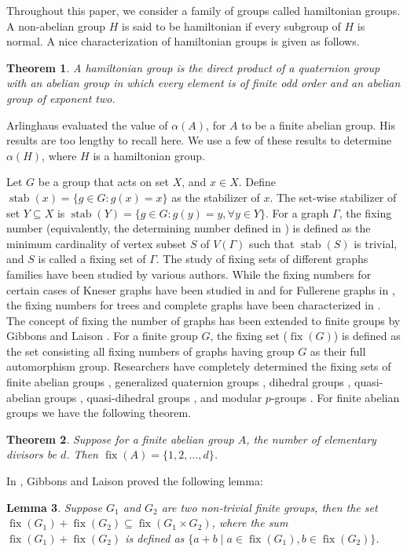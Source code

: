 \documentclass[12pt]{article}
\theoremstyle{plain}
\newtheorem{theorem}{Theorem}[section]
\newtheorem{lemma}[theorem]{Lemma}
\theoremstyle{definition}
\newcommand{\stab}{\mathop{\mathrm{stab}}}
\newcommand{\fix}{\mathop{\mathrm{fix}}}
\begin{document}
	Throughout this paper, we consider a family of groups called hamiltonian groups. A non-abelian group $H$ is said to be hamiltonian if every subgroup of $H$ is normal. A nice characterization of hamiltonian groups is given as follows.
	\begin{theorem} \cite{mha}
		A hamiltonian group is the direct product of a quaternion group with an abelian group in which every element is of finite odd order and an abelian group of exponent two.
	\end{theorem}
	Arlinghaus \cite{wca} evaluated the value of $\alpha(A)$, for $A$ to be a finite abelian group. His results are too lengthy to recall here. We use a few of these results to determine $\alpha(H)$, where $H$ is a hamiltonian group. 
	
	
	Let $G$ be a group that acts on set $X$, and $x\in X$. Define $\stab(x) = \{g \in G : g(x) = x\}$ as the stabilizer of $x$. The set-wise stabilizer of set $Y \subseteq X$ is $\stab(Y) = \{g \in G : g(y) = y, \forall y \in Y\}$. For a graph $\Gamma$, the fixing number (equivalently, the determining number defined in \cite{ldb}) is defined as the minimum cardinality of vertex subset $S$ of $V(\Gamma)$ such that $\stab(S)$ is trivial, and $S$ is called a fixing set of $\Gamma$. The study of fixing sets of different graphs families have been studied by various authors. While the fixing numbers for certain cases of Kneser graphs have been studied in \cite{ldb,cggmp} and for Fullerene graphs in \cite{kam}, the fixing numbers for trees and complete graphs have been characterized in \cite{fhed}. The concept of fixing the number of graphs has been extended to finite groups by Gibbons and Laison \cite{jdl}. For a finite group $G$, the fixing set ($\fix(G)$) is defined as the set consisting all fixing numbers of graphs having group $G$ as their full automorphism group. Researchers have completely determined the fixing sets of finite abelian groups \cite{jdl}, generalized quaternion groups \cite{lklgchh}, dihedral groups \cite{lkla}, quasi-abelian groups \cite{ummul}, quasi-dihedral groups \cite{ummul}, and modular $p$-groups \cite{sm}. For finite abelian groups we have the following theorem.
	\begin{theorem}\cite{jdl}
		\label{fixing_abelian}
		Suppose for a finite abelian group $A$, the number of elementary divisors be $d$. Then $\fix(A)=\{1,2,\ldots,d\}$.
	\end{theorem}
	In \cite{jdl}, Gibbons and Laison proved the following lemma:
	\begin{lemma}
		\cite{jdl}\label{fixing_lm1}
		Suppose $G_{1}$ and $G_{2}$ are two non-trivial finite groups, then the set $\fix(G_{1}) + \fix(G_{2}) \subseteq \fix(G_{1} \times G_{2})$, where the sum $\fix(G_{1}) + \fix(G_{2})$ is defined as $\{a + b 
		\mid a \in \fix(G_{1}), b \in \fix(G_{2})\}$.
	\end{lemma}
\end{document}
